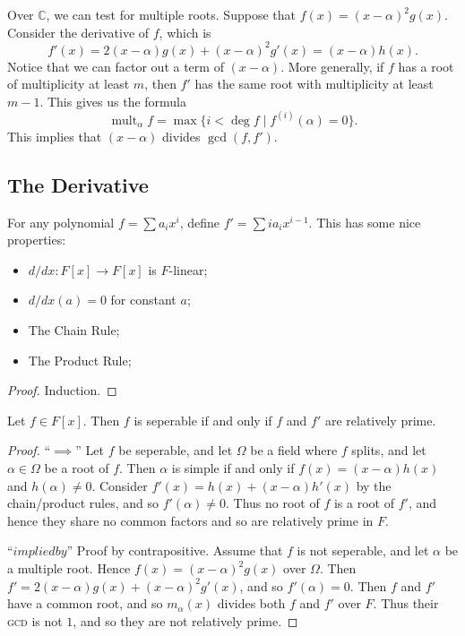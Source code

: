 Over $\mathbb{C}$, we can test for multiple roots. Suppose that $f(x) = (x-\alpha)^2g(x)$. Consider the derivative of $f$, which is 
\[ f'(x) = 2(x-\alpha)g(x) + (x-\alpha)^2g'(x) = (x-\alpha)h(x). \]
Notice that we can factor out a term of $(x-\alpha)$. More generally, if $f$ has a root of multiplicity at least $m$, then $f'$ has the same root with multiplicity at least $m-1$. This gives us the formula
\[ \operatorname{mult}_\alpha f = \max\{i < \deg f \mid f^{(i)}(\alpha) = 0\}. \]
This implies that $(x-\alpha)$ divides $\gcd(f,f')$.

\subsection{The Derivative}

For any polynomial $f = \sum a_ix^i$, define $f' = \sum ia_ix^{i-1}$. This has some nice properties:
\begin{itemize}
\item $d/dx\colon F[x] \to F[x]$ is $F$-linear;
\item $d/dx(a) = 0$ for constant $a$;
\item The Chain Rule;
\item The Product Rule;
\end{itemize}

\begin{proof}
Induction.
\end{proof}

\begin{proposition}
Let $f \in F[x]$. Then $f$ is seperable if and only if $f$ and $f'$ are relatively prime.
\end{proposition}

\begin{proof}
``$\implies$'' Let $f$ be seperable, and let $\Omega$ be a field where $f$ splits, and let $\alpha \in \Omega$ be a root of $f$. Then $\alpha$ is simple if and only if $f(x) = (x-\alpha)h(x)$ and $h(\alpha) \not= 0$. Consider $f'(x) = h(x) + (x-\alpha)h'(x)$ by the chain/product rules, and so $f'(\alpha) \not= 0$. Thus no root of $f$ is a root of $f'$, and hence they share no common factors and so are relatively prime in $F$.

``$impliedby$'' Proof by contrapositive. Assume that $f$ is not seperable, and let $\alpha$ be a multiple root. Hence $f(x) = (x-\alpha)^2g(x)$ over $\Omega$. Then $f' = 2(x-\alpha)g(x) + (x-\alpha)^2g'(x)$, and so $f'(\alpha) = 0$. Then $f$ and $f'$ have a common root, and so $m_\alpha(x)$ divides both $f$ and $f'$ over $F$. Thus their \textsc{gcd} is not $1$, and so they are not relatively prime.
\end{proof}

